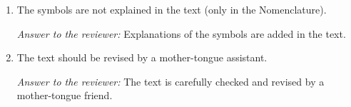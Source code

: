 \documentclass[12pt]{letter}
\begin{document}
\begin{enumerate}
\item The symbols are not explained in the text (only in the Nomenclature).

\begin{snugshade*}
\emph{Answer to the reviewer:} 
Explanations of the symbols are added in the text.
\end{snugshade*}

\item The text should be revised by a mother-tongue assistant.

\begin{snugshade*}
\emph{Answer to the reviewer:} 
The text is carefully checked and revised by a mother-tongue friend.
\end{snugshade*}

\end{enumerate}
\end{document}
